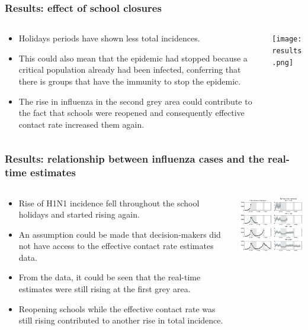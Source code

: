 \documentclass{beamer}
\begin{document}
\begin{frame}
    \frametitle{Results: effect of school closures}
    \begin{columns}
    \begin{column}{0.5\textwidth}
    \begin{itemize}
        \small
        \item Holidays periods have shown less total incidences.
        \item This could also mean that the epidemic had stopped because a critical population already had been infected, conferring that there is groups that have the immunity to stop the epidemic.
        \item The rise in influenza in the second grey area could contribute to the fact that schools were reopened and consequently effective contact rate increased them again.
    \end{itemize}
    \end{column}
    \begin{column}{0.5\textwidth}
    \texttt{[image: results.png]}
    \end{column}
    \end{columns}
\end{frame}

\begin{frame}
    \frametitle{Results: relationship between influenza cases and the real-time estimates}
    \begin{columns}
    \begin{column}{0.5\textwidth}
    \begin{itemize}
        \small
        \item Rise of H1N1 incidence fell throughout the school holidays and started rising again.
        \item An assumption could be made that decision-makers did not have access to the effective contact rate estimates data.
        \item From the data, it could be seen that the real-time estimates were still rising at the first grey area.
        \item Reopening schools while the effective contact rate was still rising contributed to another rise in total incidence.
    \end{itemize}
    \end{column}
    \begin{column}{0.5\textwidth}
    \includegraphics[width=15em]{time-varying.png}
    \end{column}
    \end{columns}
\end{frame}
\end{document}
